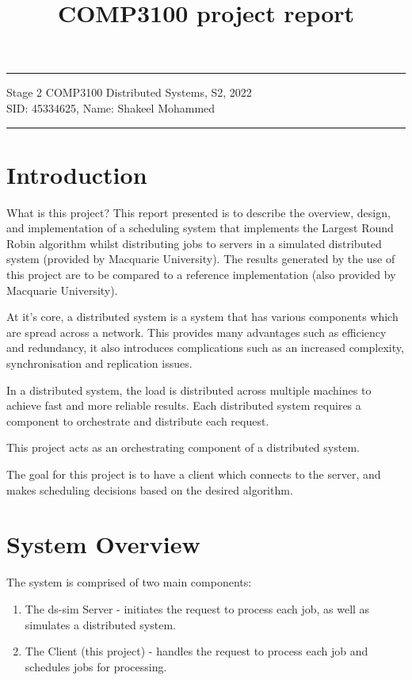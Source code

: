 \documentclass[a4paper]{article}
\begin{document}
\title{COMP3100 project report}
\hrule \medskip
\begin{minipage}{0.9\textwidth}
\centering 
\large
Stage 2 COMP3100 Distributed Systems, S2, 2022\\
\normalsize
SID: 45334625, Name: Shakeel Mohammed
\end{minipage}
\medskip\hrule
\bigskip

\section{Introduction}
What is this project?
This report presented is to describe the overview, design, and implementation of a scheduling system that implements the Largest Round Robin algorithm whilst distributing jobs to servers in a simulated distributed system (provided by Macquarie University). The results generated by the use of this project are to be compared to a reference implementation (also provided by Macquarie University).

At it's core, a distributed system is a system that has various components which are spread across a network. This provides many advantages such as efficiency and redundancy, it also introduces complications such as an increased complexity, synchronisation and replication issues.

In a distributed system, the load is distributed across multiple machines to achieve fast and more reliable results. Each distributed system requires a component to orchestrate and distribute each request.

This project acts as an orchestrating component of a distributed system.

The goal for this project is to have a client which connects to the server, and makes scheduling decisions based on the desired algorithm.

\section{System Overview}
\label{sec:section2}
The system is comprised of two main components:
\begin{enumerate}
  \item The ds-sim Server - initiates the request to process each job, as well as simulates a distributed system.
  \item The Client (this project) - handles the request to process each job and schedules jobs for processing.
\end{enumerate}
\end{document}

